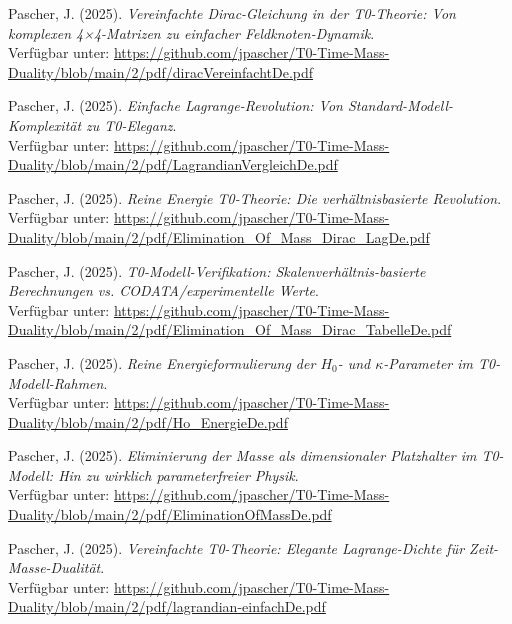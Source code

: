\documentclass[12pt,a4paper]{article}
\begin{document}
	\begin{thebibliography}{99}
		Pascher, J. (2025). \textit{Vereinfachte Dirac-Gleichung in der T0-Theorie: Von komplexen 4×4-Matrizen zu einfacher Feldknoten-Dynamik}. \\
		Verfügbar unter: \url{https://github.com/jpascher/T0-Time-Mass-Duality/blob/main/2/pdf/diracVereinfachtDe.pdf}
		
		Pascher, J. (2025). \textit{Einfache Lagrange-Revolution: Von Standard-Modell-Komplexität zu T0-Eleganz}. \\
		Verfügbar unter: \url{https://github.com/jpascher/T0-Time-Mass-Duality/blob/main/2/pdf/LagrandianVergleichDe.pdf}
		
		Pascher, J. (2025). \textit{Reine Energie T0-Theorie: Die verhältnisbasierte Revolution}. \\
		Verfügbar unter: \url{https://github.com/jpascher/T0-Time-Mass-Duality/blob/main/2/pdf/Elimination_Of_Mass_Dirac_LagDe.pdf}
		
		Pascher, J. (2025). \textit{T0-Modell-Verifikation: Skalenverhältnis-basierte Berechnungen vs. CODATA/experimentelle Werte}. \\
		Verfügbar unter: \url{https://github.com/jpascher/T0-Time-Mass-Duality/blob/main/2/pdf/Elimination_Of_Mass_Dirac_TabelleDe.pdf}
		
		Pascher, J. (2025). \textit{Reine Energieformulierung der $H_0$- und $\kappa$-Parameter im T0-Modell-Rahmen}. \\
		Verfügbar unter: \url{https://github.com/jpascher/T0-Time-Mass-Duality/blob/main/2/pdf/Ho_EnergieDe.pdf}
		
		Pascher, J. (2025). \textit{Eliminierung der Masse als dimensionaler Platzhalter im T0-Modell: Hin zu wirklich parameterfreier Physik}. \\
		Verfügbar unter: \url{https://github.com/jpascher/T0-Time-Mass-Duality/blob/main/2/pdf/EliminationOfMassDe.pdf}
		
		Pascher, J. (2025). \textit{Vereinfachte T0-Theorie: Elegante Lagrange-Dichte für Zeit-Masse-Dualität}. \\
		Verfügbar unter: \url{https://github.com/jpascher/T0-Time-Mass-Duality/blob/main/2/pdf/lagrandian-einfachDe.pdf}
		

\end{thebibliography}
\end{document}
